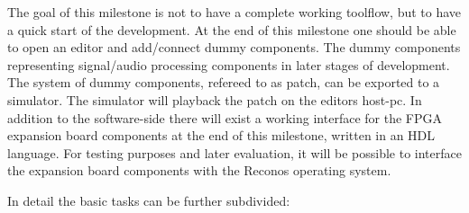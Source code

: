 The goal of this milestone is not to have a complete working toolflow, but to have a quick start of the development. 
At the end of this milestone one should be able to open an editor and add/connect dummy components. 
The dummy components representing signal/audio processing components in later stages of development. 
The system of dummy components, refereed to as patch, can be exported to a simulator. The simulator will playback the patch on the editors host-pc. 
In addition to the software-side there will exist a working interface for the \ac{FPGA} expansion board components at the end of this milestone, written in an HDL language. 
For testing purposes and later evaluation, it will be possible to interface the expansion board components with the Reconos operating system.

In detail the basic tasks can be further subdivided:

